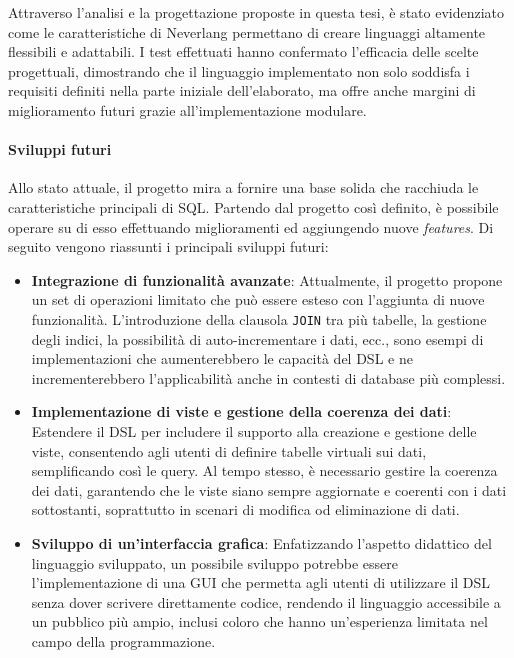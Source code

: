 \documentclass[12pt,a4paper,openright,twoside]{book}
\begin{document}
Attraverso l’analisi e la progettazione proposte in questa tesi, è stato evidenziato come le caratteristiche di Neverlang permettano 
di creare linguaggi altamente flessibili e adattabili. I test effettuati hanno confermato l’efficacia delle scelte progettuali, 
dimostrando che il linguaggio implementato non solo soddisfa i requisiti definiti nella parte iniziale dell’elaborato, ma offre 
anche margini di miglioramento futuri grazie all’implementazione modulare.

\paragraph{Sviluppi futuri}
Allo stato attuale, il progetto mira a fornire una base solida che racchiuda le caratteristiche principali di SQL. Partendo dal 
progetto così definito, è possibile operare su di esso effettuando miglioramenti ed aggiungendo nuove \textit{features}. Di seguito 
vengono riassunti i principali sviluppi futuri:
\begin{itemize}
    \item \textbf{Integrazione di funzionalità avanzate}: Attualmente, il progetto propone un set di operazioni limitato che può 
    essere esteso con l’aggiunta di nuove funzionalità. L’introduzione della clausola \texttt{JOIN} tra più tabelle, la gestione 
    degli indici, la possibilità di auto-incrementare i dati, ecc., sono esempi di implementazioni che aumenterebbero le capacità 
    del DSL e ne incrementerebbero l’applicabilità anche in contesti di database più complessi.
    \item \textbf{Implementazione di viste e gestione della coerenza dei dati}: Estendere il DSL per includere il supporto alla 
    creazione e gestione delle viste, consentendo agli utenti di definire tabelle virtuali sui dati, semplificando così le query. 
    Al tempo stesso, è necessario gestire la coerenza dei dati, garantendo che le viste siano sempre aggiornate e coerenti con i 
    dati sottostanti, soprattutto in scenari di modifica od eliminazione di dati.
    \item \textbf{Sviluppo di un’interfaccia grafica}: Enfatizzando l’aspetto didattico del linguaggio sviluppato, un possibile 
    sviluppo potrebbe essere l’implementazione di una \ac{GUI} che permetta agli utenti di utilizzare il DSL senza dover scrivere 
    direttamente codice, rendendo il linguaggio accessibile a un pubblico più ampio, inclusi coloro che hanno un’esperienza 
    limitata nel campo della programmazione.
\end{itemize}


\backmatter


\end{document}
